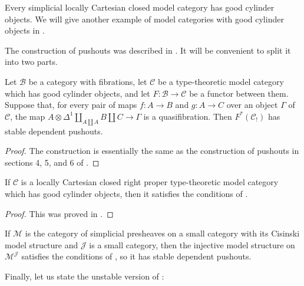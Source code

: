 \documentclass[reqno]{amsart}
\theoremstyle{definition}
\theoremstyle{remark}
\newcommand{\scat}[1]{\mathcal{#1}}
\numberwithin{figure}{section}
\begin{document}
Every simplicial locally Cartesian closed model category has good cylinder objects.
We will give another example of model categories with good cylinder objects in .

The construction of pushouts was described in \cite{lum-shul-hits}.
It will be convenient to split it into two parts.

\begin{lem}[pushouts]
Let $\scat{B}$ be a category with fibrations, let $\scat{C}$ be a type-theoretic model category which has good cylinder objects, and let $F : \scat{B} \to \scat{C}$ be a functor between them.
Suppose that, for every pair of maps $f : A \to B$ and $g : A \to C$ over an object $\Gamma$ of $\scat{C}$, the map $A \otimes \Delta^1 \amalg_{A \amalg A} B \amalg C \to \Gamma$ is a quasifibration.
Then $F^*(\scat{C}_!)$ has stable dependent pushouts.
\end{lem}
\begin{proof}
The construction is essentially the same as the construction of pushouts in sections 4, 5, and 6 of \cite{lum-shul-hits}.
\end{proof}

\begin{lem}
If $\scat{C}$ is a locally Cartesian closed right proper type-theoretic model category which has good cylinder objects, then it satisfies the conditions of .
\end{lem}
\begin{proof}
This was proved in \cite[Theorem~4.2]{lum-shul-hits}.
\end{proof}

\begin{example}
If $\scat{M}$ is the category of simplicial presheaves on a small category with its Cisinski model structure \cite{cisinski-presheaf,cisinski} and $\scat{J}$ is a small category,
then the injective model structure on $\scat{M}^\scat{J}$ satisfies the conditions of , so it has stable dependent pushouts.
\end{example}

Finally, let us state the unstable version of :
\end{document}
